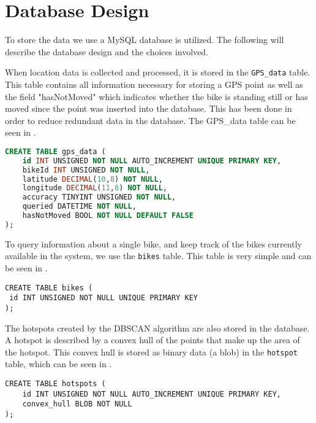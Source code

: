 \chapter{Database Design}\label{database_design}
To store the data we use a MySQL database is utilized.
The following will describe the database design and the choices involved.

When location data is collected and processed, it is stored in the \texttt{GPS\_data} table.
This table contains all information necessary for storing a GPS point as well as the field "hasNotMoved" which indicates whether the bike is standing still or has moved since the point was inserted into the database.
This has been done in order to reduce redundant data in the database.
The GPS\_data table can be seen in .

\begin{lstlisting}[caption=Table for GPS\_data, label=tbl_gpsdata, language=SQL]
CREATE TABLE gps_data (
	id INT UNSIGNED NOT NULL AUTO_INCREMENT UNIQUE PRIMARY KEY,
	bikeId INT UNSIGNED NOT NULL,
	latitude DECIMAL(10,8) NOT NULL,
	longitude DECIMAL(11,8) NOT NULL,
	accuracy TINYINT UNSIGNED NOT NULL,
	queried DATETIME NOT NULL,
	hasNotMoved BOOL NOT NULL DEFAULT FALSE
);
\end{lstlisting}

To query information about a single bike, and keep track of the bikes currently available in the system, we use the \texttt{bikes} table.
This table is very simple and can be seen in .

\begin{lstlisting}[caption=Table for bikes, label=tbl_bikes]
CREATE TABLE bikes (
 id INT UNSIGNED NOT NULL UNIQUE PRIMARY KEY
);
\end{lstlisting}

The hotspots created by the DBSCAN algorithm are also stored in the database.
A hotspot is described by a convex hull of the points that make up the area of the hotspot.
This convex hull is stored as binary data (a blob) in the \texttt{hotspot} table, which can be seen in .

\begin{lstlisting}[caption=Table for hotspots, label=tbl_hotspot]
CREATE TABLE hotspots (
	id INT UNSIGNED NOT NULL AUTO_INCREMENT UNIQUE PRIMARY KEY,
	convex_hull BLOB NOT NULL
);
\end{lstlisting}